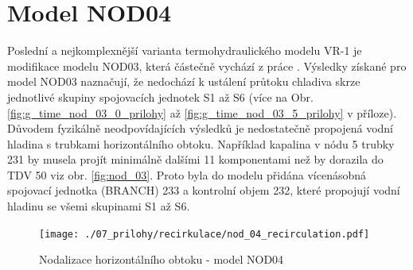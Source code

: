  \section{Model NOD04}
 \label{sec:nod_04}
Poslední a nejkomplexnější varianta termohydraulického modelu VR-1 je modifikace modelu NOD03, která částečně vychází z práce \cite{CAPABILITY2017RELAP}. Výsledky získané pro model NOD03 naznačují, že nedochází k ustálení průtoku chladiva skrze jednotlivé skupiny spojovacích jednotek S1 až S6 (více na Obr. \ref{fig:g_time_nod_03_0_prilohy} až \ref{fig:g_time_nod_03_5_prilohy} v příloze). Důvodem fyzikálně neodpovídajících výsledků je nedostatečně propojená vodní hladina s trubkami horizontálního obtoku. Například kapalina v nódu 5 trubky 231 by musela projít minimálně dalšími 11 komponentami než by dorazila do TDV 50 viz obr. \ref{fig:nod_03}. Proto byla do modelu přidána vícenásobná spojovací jednotka (BRANCH) 233 a kontrolní objem 232, které propojují vodní hladinu se všemi skupinami S1 až S6. 
  \begin{figure}[H]
	\centering
\texttt{[image: ./07\_prilohy/recirkulace/nod\_04\_recirculation.pdf]}
	\caption{Nodalizace horizontálního obtoku - model NOD04}
	\label{fig:nod_04}
\end{figure}
